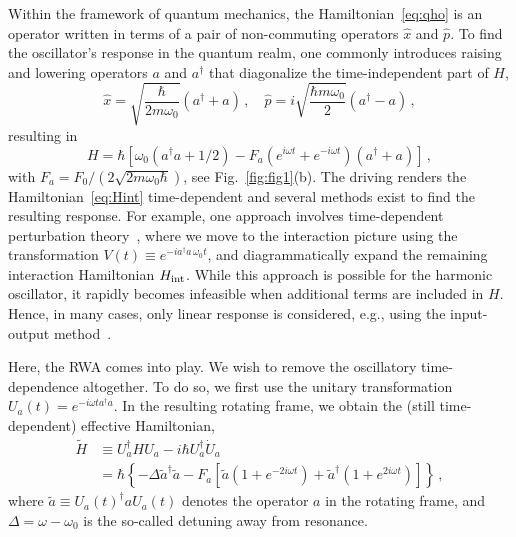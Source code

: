 Within the framework of quantum mechanics, the Hamiltonian~\eqref{eq:qho} is an operator written in terms of a pair of non-commuting operators $\hat{x}$ and $\hat{p}$.
To find the oscillator’s response in the quantum realm, one commonly introduces raising and lowering operators
$a$ and $a^\dagger$ that diagonalize the time-independent
part of $H$,
\begin{equation} \label{eq:as}
\hat{x} =\sqrt{\frac{\hbar}{2m\omega_0}}(a^\dagger+a)\,, \quad \hat{p} = i\sqrt{\frac{\hbar m \omega_0}{2}}(a^\dagger - a)\,, 
\end{equation}
resulting in
\begin{equation} \label{eq:Hint}
H = \hbar \left[ \omega_0(a^\dagger a+1/2)-  F_a(e^{i\omega t} +e^{-i\omega t})(a^\dagger+a) \right]\,,
\end{equation}
with $F_a=F_0/(2\sqrt{2m\omega_0 \hbar})$, see Fig.~\ref{fig:fig1}(b). The driving renders the Hamiltonian~\eqref{eq:Hint} time-dependent and several methods exist to find the resulting response. For example, one approach involves time-dependent perturbation theory~\cite{Sakurai_1995}, where we move to the interaction picture using the transformation $V(t)\equiv e^{-i a^\dagger a \,\omega_0 t}$, and diagrammatically expand the remaining interaction Hamiltonian $H_{\rm int}$. While this approach is possible for the harmonic oscillator, it rapidly becomes infeasible when additional terms are included in $H$. Hence, in many cases, only linear response is considered, e.g., using the input-output method~\cite{Walls_Milburn}.

Here, the RWA comes into play. We wish to remove the oscillatory time-dependence altogether. To do so, we first use the unitary transformation $U_a(t) = e^{-i \omega t a^\dagger a}$. In the resulting rotating frame, we obtain the (still time-dependent) effective Hamiltonian,
\begin{align}\label{eq:rot_H}
\tilde{H} &\equiv U_a^\dagger H U_a - i \hbar U_a^\dagger \dot{U}_a \\
&=\hbar\left\{-\Delta \tilde{a}^\dagger \tilde{a} - F_a\left[ \tilde{a} \left (1+e^{-2i\omega t} \right) + \tilde{a}^\dagger \left(1 + e^{2i\omega t}\right) \right] \right\} \,,\nonumber
\end{align}
where $\tilde{a} \equiv U_a(t)^\dagger a U_a(t)$ denotes the operator $a$ in the rotating frame, and $\Delta=\omega - \omega_0$ is the so-called detuning away from resonance.

